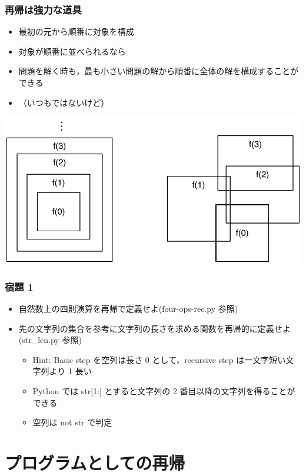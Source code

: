 \begin{frame}[fragile]
\frametitle{再帰は強力な道具}
  \begin{itemize}
\item 最初の元から順番に対象を構成
\item 対象が順番に並べられるなら
\item 問題を解く時も，最も小さい問題の解から順番に全体の解を構成することができる
\item （いつもではないけど）
  \end{itemize}
  \begin{center}
\includegraphics[scale=0.3]{./Figure/Structure.pdf}
  \end{center}
\end{frame}
\begin{frame}[fragile]
\frametitle{宿題 1}
  \begin{itemize}
\item 自然数上の四則演算を再帰で定義せよ(four-ops-rec.py 参照)
\item 先の文字列の集合を参考に文字列の長さを求める関数を再帰的に定義せよ(str\_len.py 参照)
    \begin{itemize}
\item Hint: Basic step を空列は長さ 0 として，recursive step は一文字短い文字列より 1 長い
\item Python では str[1:] とすると文字列の 2 番目以降の文字列を得ることができる
\item 空列は not str で判定
    \end{itemize}
  \end{itemize}
\end{frame}
\section{プログラムとしての再帰}
